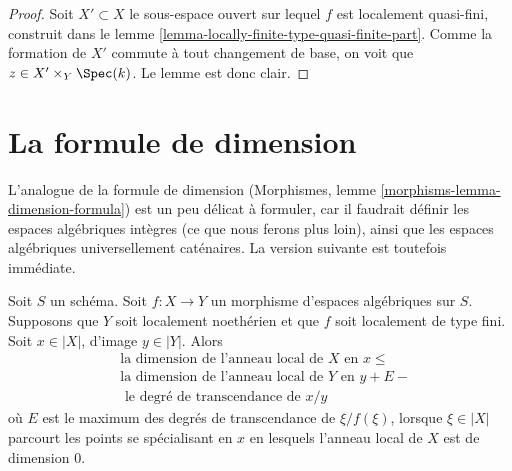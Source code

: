 \begin{proof}
Soit $X' \subset X$ le sous-espace ouvert sur lequel $f$ est localement quasi-fini,
construit dans le
lemme \ref{lemma-locally-finite-type-quasi-finite-part}.
Comme la formation de $X'$ commute à tout changement de base, on voit
que $z \in X' \times_Y \Spec(k)$. Le lemme est donc clair.
\end{proof}





\section{La formule de dimension}
\label{section-dimension-formula}

\noindent
L'analogue de la formule de dimension
(Morphismes, lemme \ref{morphisms-lemma-dimension-formula})
est un peu délicat à formuler, car il faudrait définir
les espaces algébriques intègres (ce que nous ferons plus loin), ainsi que
les espaces algébriques universellement caténaires. La
version suivante est toutefois immédiate.

\begin{lemma}
\label{lemma-dimension-formula-general}
Soit $S$ un schéma. Soit $f : X \to Y$ un morphisme d'espaces
algébriques sur $S$. Supposons que $Y$ soit localement noethérien et que $f$ soit localement
de type fini. Soit $x \in |X|$, d'image $y \in |Y|$.
Alors
\begin{align*}
& \text{la dimension de l'anneau local de }X\text{ en }x \leq \\
& \text{la dimension de l'anneau local de }Y\text{ en }y + E - \\
& \text{ le degré de transcendance de }x/y
\end{align*}
où $E$ est le maximum des degrés de transcendance de $\xi/f(\xi)$,
lorsque $\xi \in |X|$ parcourt les points se spécialisant en $x$ en lesquels
l'anneau local de $X$ est de dimension $0$.
\end{lemma}


